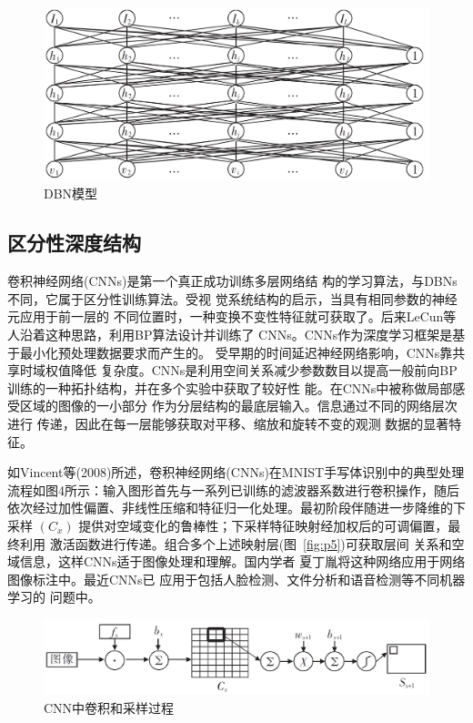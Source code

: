 \documentclass[UTF8]{article}
\begin{document}
	\begin{figure}[H]
	\centering
	\includegraphics[scale = 0.3]{Figures/3.png} 
	\caption{DBN模型}
	\label{fig:p3}
	\end{figure}
	
	\subsection{区分性深度结构}
	卷积神经网络(CNNs)是第一个真正成功训练多层网络结
	构的学习算法，与DBNs不同，它属于区分性训练算法。受视
	觉系统结构的启示，当具有相同参数的神经元应用于前一层的
	不同位置时，一种变换不变性特征就可获取了。后来LeCun等人沿着这种思路，利用BP算法设计并训练了 CNNs。CNNs作为深度学习框架是基于最小化预处理数据要求而产生的。
	受早期的时间延迟神经网络影响，CNNs靠共享时域权值降低
	复杂度。CNNs是利用空间关系减少参数数目以提高一般前向BP训练的一种拓扑结构，并在多个实验中获取了较好性
	能\cite{v6,v22}。在CNNs中被称做局部感受区域的图像的一小部分
	作为分层结构的最底层输入。信息通过不同的网络层次进行
	传递，因此在每一层能够获取对平移、缩放和旋转不变的观测
	数据的显著特征。
	
	如Vincent等(2008)\cite{v6,v22}所述，卷积神经网络(CNNs)在MNIST手写体识别中的典型处理流程如图4所示：输入图形首先与一系列已训练的滤波器系数进行卷积操作\label{sec:cnn_conv}，随后依次经过加性偏置、非线性压缩和特征归一化处理。最初阶段伴随进一步降维的下采样 $(C_{x})$ 提供对空域变化的鲁棒性；下采样特征映射经加权后的可调偏置，最终利用
	激活函数进行传递。组合多个上述映射层(图~\ref{fig:p5})可获取层间
	关系和空域信息，这样CNNs适于图像处理和理解。国内学者
	夏丁胤\cite{v23}将这种网络应用于网络图像标注中。最近CNNs已
	应用于包括人脸检测、文件分析和语音检测等不同机器学习的
	问题中。
	
	\begin{figure}[H]
	\centering
	\includegraphics[scale = 0.4]{Figures/4.png} 
	\caption{CNN中卷积和采样过程}
	\label{fig:p4}
	\end{figure}
	
\end{document}
